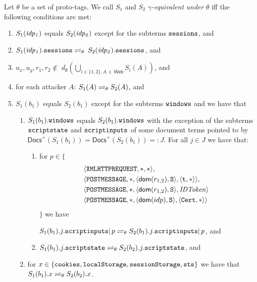   \begin{definition}\label{def:rp:eq-of-states}
    Let $\theta$ be a set of proto-tags. %
    We call $S_1$ and $S_2$ \emph{$\gamma$-equivalent under 
    $\theta$} iff the following conditions are met:
    \begin{enumerate}
    \item\label{eqs:rp:idp} 
      $S_1(\mathit{idp_1})$ equals $S_2(\mathit{idp_2})$ except
      for the subterms $\mathtt{sessions}$, and
    \item\label{eqs:rp:idp-sessions} 
      $S_1(\mathit{idp_1}).\mathtt{sessions} \rightleftharpoons_{\theta}$ 
      $S_2(\mathit{idp_2}).\mathtt{sessions}$, and
    \item\label{eqs:rp:att-unknown}
      $u_x, u_y, r_1, r_2 \not\in $
      $d_\emptyset(\bigcup_{i\in\{1,2\},A\,\in\,\mathsf{Web}}S_i(A))$, and
    \item\label{eqs:rp:att} 
      for each attacker $A$:
      $S_1(A) \rightleftharpoons_{\theta} S_2(A)$, and
    \item\label{eqs:rp:b} 
      $S_1(b_1)$ equals $S_2(b_1)$ except for the subterms 
      $\mathtt{windows}$ and we have that
      \begin{enumerate}
      \item\label{eqs:rp:b:w}
        $S_1(b_1).\mathtt{windows}$ equals $S_2(b_1).\mathtt{windows}$ 
        with the exception of the subterms $\mathtt{scriptstate}$ 
        and $\mathtt{scriptinputs}$ of some document terms pointed 
        to by $\mathsf{Docs}^+(S_1(b_1)) = \mathsf{Docs}^+(S_2(b_1)) =: J$. 
        For all $j \in J$ we have that: 
        \begin{enumerate}
        \item for $p \in \{$
          \begin{align*}
            & \langle\mathtt{XMLHTTPREQUEST},*,*\rangle,\\
            & \langle\mathtt{POSTMESSAGE},*,\langle\mathsf{dom}(r_{1,2}), \mathtt{S}\rangle,\langle\mathtt{t}, *\rangle\rangle,\\
            & \langle\mathtt{POSTMESSAGE},*,\langle\mathsf{dom}(r_{1,2}), \mathtt{S}\rangle,\mathit{IDToken}\rangle\\
            & \langle\mathtt{POSTMESSAGE},*,\langle\mathsf{dom}(idp), \mathtt{S}\rangle,\langle\mathtt{Cert}, *\rangle\rangle
          \end{align*}
          $\}$ we have
  
          $S_1(b_1).j.\mathtt{scriptinputs} |\, p \rightleftharpoons_{\theta}
          S_2(b_1).j.\mathtt{scriptinputs} |\, p$, and
        \item\label{eqs:rp:b:w:script}
          $S_1(b_1).j.\mathtt{scriptstate} \rightleftharpoons_{\theta}
          S_2(b_2).j.\mathtt{scriptstate}$, and 
        \end{enumerate}
      \item\label{eqs:b:misc} for
        $x \in \{\mathtt{cookies},\mathtt{localStorage},\mathtt{sessionStorage},\mathtt{sts}\}$
        we have that $S_1(b_1).x \rightleftharpoons_{\theta} S_2(b_2).x$.
      \end{enumerate}
    \end{enumerate}
  \end{definition}
  
